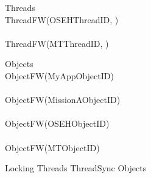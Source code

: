 %
\begin{circus}
\circprocess Threads \circdef  \\
\circblockopen
ThreadFW(OSEHThreadID, ) \\
\interleave \\
ThreadFW(MTThreadID, ) \\

\circblockclose
\end{circus}
%
%
\begin{circus}
\circprocess Objects \circdef \\
\circblockopen
ObjectFW(MyAppObjectID) \\
\interleave \\
ObjectFW(MissionAObjectID) \\
\interleave \\
ObjectFW(OSEHObjectID) \\
\interleave \\
ObjectFW(MTObjectID) \\

\circblockclose
\end{circus}
%
%
\begin{circus}
\circprocess Locking \circdef Threads \lpar ThreadSync \rpar Objects
\end{circus}

